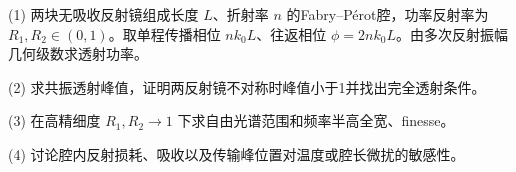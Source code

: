 (1) 两块无吸收反射镜组成长度 \(L\)、折射率 \(n\) 的Fabry–Pérot腔，功率反射率为 \(R_1,R_2\in(0,1)\)。取单程传播相位 \(nk_0L\)、往返相位 \(\phi=2nk_0L\)。由多次反射振幅几何级数求透射功率。

(2) 求共振透射峰值，证明两反射镜不对称时峰值小于1并找出完全透射条件。

(3) 在高精细度 \(R_1,R_2\to1\) 下求自由光谱范围和频率半高全宽、finesse。

(4) 讨论腔内反射损耗、吸收以及传输峰位置对温度或腔长微扰的敏感性。
